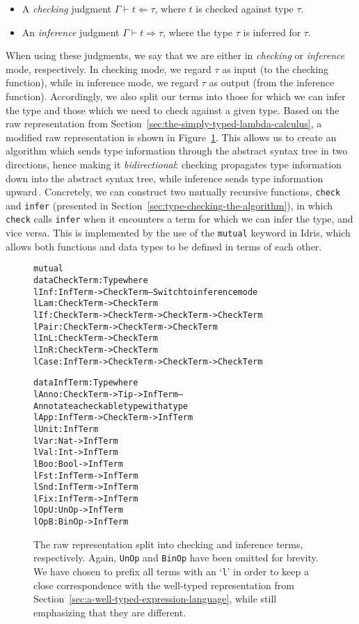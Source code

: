 \begin{itemize}
\item A \emph{checking} judgment $\Gamma \vdash t \Leftarrow \tau$, where $t$ is checked against type $\tau$.
\item An \emph{inference} judgment $\Gamma \vdash t \Rightarrow \tau$, where the type $\tau$ is inferred for $\tau$.
\end{itemize}

When using these judgments, we say that we are either in \emph{checking} or \emph{inference} mode, respectively. In checking mode, we regard $\tau$ as input (to the checking function), while in inference mode, we regard $\tau$ as output (from the inference function). Accordingly, we also split our terms into those for which we can infer the type and those which we need to check against a given type. Based on the raw representation from Section~\ref{sec:the-simply-typed-lambda-calculus}, a modified raw representation is shown in Figure~\ref{fig:bidirectional-terms}. This allows us to create an algorithm which sends type information through the abstract syntax tree in two directions, hence making it \emph{bidirectional}: checking propagates type information down into the abstract syntax tree, while inference sends type information upward\,\cite{Pfenning:bidirectional}. Concretely, we can construct two mutually recursive functions, \texttt{check} and \texttt{infer} (presented in Section~\ref{sec:type-checking-the-algorithm}), in which \texttt{check} calls \texttt{infer} when it encounters a term for which we can infer the type, and vice versa. This is implemented by the use of the \texttt{mutual} keyword in Idris, which allows both functions and data types to be defined in terms of each other.

\begin{figure}
\begin{alltt}
mutual
 data CheckTerm : Type where
   lInf  : InfTerm -> CheckTerm -- Switch to inference mode
   lLam  : CheckTerm -> CheckTerm
   lIf   : CheckTerm -> CheckTerm -> CheckTerm -> CheckTerm
   lPair : CheckTerm -> CheckTerm -> CheckTerm
   lInL  : CheckTerm -> CheckTerm
   lInR  : CheckTerm -> CheckTerm
   lCase : InfTerm -> CheckTerm -> CheckTerm -> CheckTerm
   
 data InfTerm : Type where
   lAnno : CheckTerm -> Tip -> InfTerm -- Annotate a checkable type with a type
   lApp  : InfTerm -> CheckTerm -> InfTerm
   lUnit : InfTerm
   lVar  : Nat -> InfTerm
   lVal  : Int -> InfTerm
   lBoo  : Bool -> InfTerm
   lFst  : InfTerm -> InfTerm
   lSnd  : InfTerm -> InfTerm
   lFix  : InfTerm -> InfTerm
   lOpU  : UnOp -> InfTerm
   lOpB  : BinOp -> InfTerm
\end{alltt}
\caption{The raw representation split into checking and inference terms, respectively. Again, \texttt{UnOp} and \texttt{BinOp} have been omitted for brevity. We have chosen to prefix all terms with an `\texttt{l}' in order to keep a close correspondence with the well-typed representation from Section~\ref{sec:a-well-typed-expression-language}, while still emphasizing that they are different.}
\label{fig:bidirectional-terms}
\end{figure}

